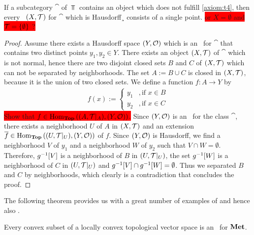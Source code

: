 \begin{proposition}
	If a subcategory $\cat$ of $\Top$ contains an object which does not fulfill \ref{axiom:t4}, then every \ane\ $\tspace$ for $\cat$ which is Hausdorff¸ consists  of a single point. \colorbox{red}{or $X = \emptyset$ and $\mathcal{T} = {\left \{ \emptyset \right \}}$ ?}
\end{proposition}
\begin{proof}
	Assume there exists a Hausdorff space $\tspace[Y][O]$ which is an \ane\ for $\cat$ that contains two distinct points $y_1, y_2 \in Y$. There exists an object $\tspace$ of $\cat$ which is not normal, hence there are two disjoint closed sets $B$ and $C$ of $\tspace$ which can not be separated by neighborhoods. The set $A := B \cup C$ is closed in $\tspace$, because it is the union of two closed sets. We define a function $f: A \to Y$ by
	\begin{align*}
		f(x) := 
		\begin{cases}
			y_1 &, \text{if } x \in B \\
			y_2 &, \text{if } x \in C
		\end{cases}
	\end{align*} 
	\colorbox{red}{Show that $f \in \Hom_\Top\pbraces{\reltspace, \tspace[Y][O]}$.} Since $\tspace[Y][O]$ is an \ane\ for the class $\cat$, there exists a neighborhood $U$ of $A$ in $\tspace$ and an extension $\overline{f} \in \Hom_\Top\pbraces{\reltspace[U], \tspace[Y][O]}$ of $f$. Since $\tspace[Y][O]$ is Hausdorff, we find a neighborhood $V$ of $y_1$ and a neighborhood $W$ of $y_2$ such that $V \cap W = \emptyset$. Therefore, $g^{-1}{\left [ V \right ]}$ is a neighborhood of $B$ in $\reltspace[U]$, the set $g^{-1}{\left [ W \right ]}$ is a neighborhood of $C$ in $\reltspace[U]$ and $g^{-1}{\left [ V \right ]} \cap g^{-1}{\left [ W \right ]} = \emptyset$. Thus we separated $B$ and $C$ by neighborhoods, which clearly is a contradiction that concludes the proof. 
\end{proof}

The following theorem provides us with a great number of examples of \aexs and hence also \anes. 

\begin{theorem}
	Every convex subset of a locally convex topological vector space is an \aex\ for $\mathbf{Met}$.
\end{theorem}

